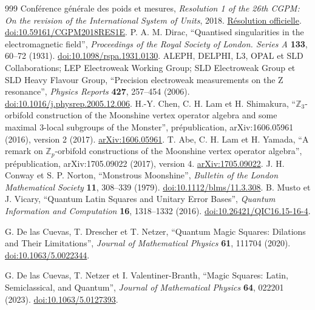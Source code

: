 \begin{thebibliography}{999}
 Conférence générale des poids et mesures, \emph{Resolution 1 of the 26th CGPM: On the revision of the International System of Units}, 2018. \href{https://www.bipm.org/en/committees/cg/cgpm/26-2018/resolution-1}{Résolution officielle}. \href{https://doi.org/10.59161/CGPM2018RES1E}{doi:10.59161/CGPM2018RES1E}.
 P. A. M. Dirac, ``Quantised singularities in the electromagnetic field'', \emph{Proceedings of the Royal Society of London. Series A} \textbf{133}, 60--72 (1931). \href{https://doi.org/10.1098/rspa.1931.0130}{doi:10.1098/rspa.1931.0130}.
 ALEPH, DELPHI, L3, OPAL et SLD Collaborations; LEP Electroweak Working Group; SLD Electroweak Group et SLD Heavy Flavour Group, ``Precision electroweak measurements on the Z resonance'', \emph{Physics Reports} \textbf{427}, 257--454 (2006). \href{https://doi.org/10.1016/j.physrep.2005.12.006}{doi:10.1016/j.physrep.2005.12.006}.
 H.-Y. Chen, C. H. Lam et H. Shimakura, ``\(\mathbb Z_3\)-orbifold construction of the Moonshine vertex operator algebra and some maximal \(3\)-local subgroups of the Monster'', prépublication, arXiv:1606.05961 (2016), version 2 (2017). \href{https://arxiv.org/abs/1606.05961}{arXiv:1606.05961}.
 T. Abe, C. H. Lam et H. Yamada, ``A remark on \(\mathbb Z_p\)-orbifold constructions of the Moonshine vertex operator algebra'', prépublication, arXiv:1705.09022 (2017), version 4. \href{https://arxiv.org/abs/1705.09022v4}{arXiv:1705.09022}.
 J. H. Conway et S. P. Norton, ``Monstrous Moonshine'', \emph{Bulletin of the London Mathematical Society} \textbf{11}, 308--339 (1979). \href{https://doi.org/10.1112/blms/11.3.308}{doi:10.1112/blms/11.3.308}.
 B. Musto et J. Vicary, ``Quantum Latin Squares and Unitary Error Bases'', \emph{Quantum Information and Computation} \textbf{16}, 1318--1332 (2016). \href{https://doi.org/10.26421/QIC16.15-16-4}{doi:10.26421/QIC16.15-16-4}.

 G. De las Cuevas, T. Drescher et T. Netzer, ``Quantum Magic Squares: Dilations and Their Limitations'', \emph{Journal of Mathematical Physics} \textbf{61}, 111704 (2020). \href{https://doi.org/10.1063/5.0022344}{doi:10.1063/5.0022344}.

 G. De las Cuevas, T. Netzer et I. Valentiner-Branth, ``Magic Squares: Latin, Semiclassical, and Quantum'', \emph{Journal of Mathematical Physics} \textbf{64}, 022201 (2023). \href{https://doi.org/10.1063/5.0127393}{doi:10.1063/5.0127393}.


\end{thebibliography}
